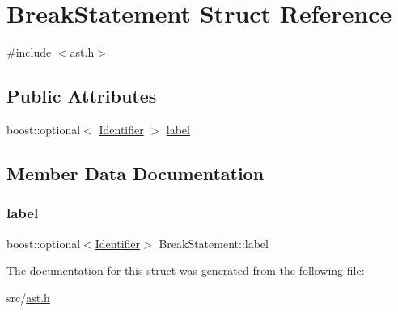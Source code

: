 \hypertarget{struct_break_statement}{}\section{Break\+Statement Struct Reference}
\label{struct_break_statement}


{\ttfamily \#include $<$ast.\+h$>$}

\subsection*{Public Attributes}
\begin{DoxyCompactItemize}
\item 
boost\+::optional$<$ \hyperlink{struct_identifier}{Identifier} $>$ \hyperlink{struct_break_statement_a0367fe642b46069be309b05e05b547c5}{label}
\end{DoxyCompactItemize}


\subsection{Member Data Documentation}
\mbox{\label{struct_break_statement_a0367fe642b46069be309b05e05b547c5}} 
\subsubsection{\texorpdfstring{label}{label}}
{\footnotesize\ttfamily boost\+::optional$<$\hyperlink{struct_identifier}{Identifier}$>$ Break\+Statement\+::label}



The documentation for this struct was generated from the following file\+:\begin{DoxyCompactItemize}
\item 
src/\hyperlink{ast_8h}{ast.\+h}\end{DoxyCompactItemize}
